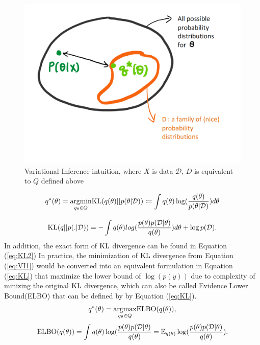  \begin{figure}[H]
 	\center
 	\includegraphics[scale = 0.2]{VIoptimization}
 	\caption{Variational Inference intuition, where $X$ is data $\mathcal{D}$, $D$ is equivalent to $Q$ defined above}
 	\label{fig:VIoptimization}
 \end{figure}

\begin{equation}
	\label{eq:VI1}
	q^{*}(\theta) = \underset{q_{\theta} \in Q}{\operatorname{argmin}} \textnormal{KL}(q(\theta)||p(\theta|\mathcal{D})) \coloneqq \int q(\theta)\log(\frac{q(\theta)}{p(\theta|\mathcal{D})})d\theta
\end{equation}

\begin{equation}
	\label{eq:KL2}
	\textnormal{KL}(q||p(.|\mathcal{D})) = - \int q(\theta)log(\frac{p(\theta)p(\mathcal{D}|\theta)}{q(\theta)}) d\theta + \log p(\mathcal{D}).
\end{equation}
In addition, the exact form of $\textnormal{KL}$ divergence can be found in Equation (\ref{eq:KL2})
In practice, the minimization of $\textnormal{KL}$ divergence from Equation (\ref{eq:VI1}) would be converted into an equivalent formulation in Equation (\ref{eq:KL}) that maximize the lower bound of $\log(p(y))$ due to complexity of minizing the original $\textnormal{KL}$ divergence, which can also be called Evidence Lower Bound(ELBO) that can be defined by by Equation (\ref{eq:KL}).
\begin{equation}
	\label{eq:KL}
	q^*(\theta) = \underset{q_{\theta} \in Q}{\operatorname{ argmax}} \textnormal{ELBO}(q(\theta)),
\end{equation}
\begin{equation}
	\label{eq:ELBO}
	\textnormal{ELBO}(q(\theta)) = \int q(\theta)\log(\frac{p(\theta)p(\mathcal{D}|\theta)}{q(\theta)} = \mathop{\mathbb{E}_{q(\theta)}}\log(\frac{p(\theta)p(\mathcal{D}|\theta)}{q(\theta)}).
\end{equation}

